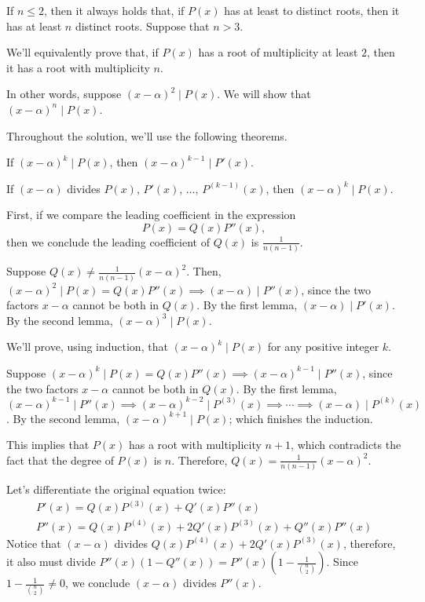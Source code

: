 \begin{sol}{}{}
	If \(n \leq 2\), then it always holds that, if \(P(x)\) has at least to distinct roots, then it has at least \(n\) distinct roots. Suppose that \(n > 3\).

	We'll equivalently prove that, if \(P(x)\) has a root of multiplicity at least \(2\), then it has a root with multiplicity \(n\).

	In other words, suppose \((x - \alpha)^2 \mid P(x)\). We will show that \((x - \alpha)^n \mid P(x)\).

	Throughout the solution, we'll use the following theorems.
	\begin{lem}{}{}
		If \((x - \alpha)^k \mid P(x)\), then \((x-\alpha)^{k-1} \mid P'(x)\).
	\end{lem}
	\begin{lem}{}{}
		If \((x-\alpha)\) divides \(P(x)\), \(P'(x)\),  \(\dots\), \(P^{(k-1)}(x)\), then \((x-\alpha)^k \mid P(x)\).
	\end{lem}

	First, if we compare the leading coefficient in the expression \[
		P(x) = Q(x)P''(x),
	\]
	then we conclude the leading coefficient of \(Q(x)\) is  \(\frac{1}{n(n-1)}\).

	Suppose  \(Q(x) \neq \frac{1}{n(n-1)}(x-\alpha)^2\). Then, \((x-\alpha)^2 \mid P(x) = Q(x) P''(x) \implies (x - \alpha) \mid P''(x)\), since the two factors \(x - \alpha\) cannot be both in \(Q(x)\). By the first lemma, \((x - \alpha) \mid P'(x)\). By the second lemma, \((x - \alpha)^3 \mid P(x)\).

	We'll prove, using induction, that \((x-\alpha)^k \mid P(x)\) for any positive integer \(k\).

	Suppose \((x-\alpha)^k \mid P(x) = Q(x) P''(x) \implies (x - \alpha)^{k-1} \mid P''(x)\), since the two factors \(x - \alpha\) cannot be both in \(Q(x)\). By the first lemma, \((x - \alpha)^{k-1} \mid P''(x) \implies (x - \alpha)^{k-2} \mid P^{(3)}(x) \implies \cdots \implies (x - \alpha) \mid P^{(k)}(x)\). By the second lemma, \((x - \alpha)^{k+1} \mid P(x)\); which finishes the induction.

	This implies that \(P(x)\) has a root with multiplicity \(n+1\), which contradicts the fact that the degree of \(P(x)\) is \(n\).
	Therefore, \(Q(x) = \frac{1}{n(n-1)} (x-\alpha)^2\).

	Let's differentiate the original equation twice:
	\begin{gather*}
		P'(x) = Q(x)P^{(3)}(x) + Q'(x)P''(x)\\
		P''(x) = Q(x)P^{(4)}(x) + 2Q'(x)P^{(3)}(x) + Q''(x)P''(x)
	\end{gather*}
	Notice that \((x-\alpha)\) divides \(Q(x)P^{(4)}(x) + 2Q'(x)P^{(3)}(x)\), therefore, it also must divide \(P''(x)(1 - Q''(x)) = P''(x)\left(1 - \frac{1}{\binom{n}{2}}\right)\). Since \(1 - \frac{1}{\binom{n}{2}} \neq 0\), we conclude \((x-\alpha)\) divides \(P''(x)\).


\end{sol}
